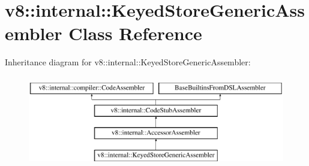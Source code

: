 \hypertarget{classv8_1_1internal_1_1KeyedStoreGenericAssembler}{}\section{v8\+:\+:internal\+:\+:Keyed\+Store\+Generic\+Assembler Class Reference}
\label{classv8_1_1internal_1_1KeyedStoreGenericAssembler}
Inheritance diagram for v8\+:\+:internal\+:\+:Keyed\+Store\+Generic\+Assembler\+:\begin{figure}[H]
\begin{center}
\leavevmode
\includegraphics[height=4.000000cm]{classv8_1_1internal_1_1KeyedStoreGenericAssembler}
\end{center}
\end{figure}

